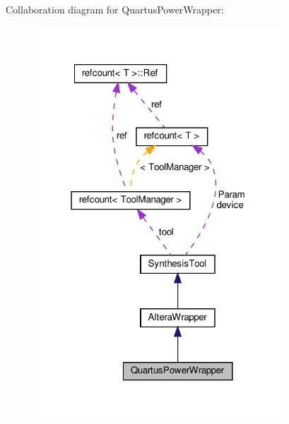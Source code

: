 Collaboration diagram for Quartus\+Power\+Wrapper\+:
\nopagebreak
\begin{figure}[H]
\begin{center}
\leavevmode
\includegraphics[width=265pt]{d6/d52/classQuartusPowerWrapper__coll__graph}
\end{center}
\end{figure}

